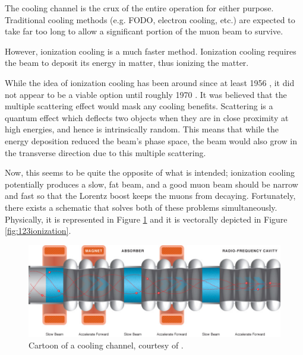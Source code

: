 The cooling channel is the crux of the entire operation for either purpose. Traditional cooling methods (e.g. FODO, electron cooling, etc.) are expected to take far too long to allow a significant portion of the muon beam to survive. 

However, ionization cooling is a much faster method. Ionization cooling requires the beam to deposit its energy in matter, thus ionizing the matter.

While the idea of ionization cooling has been around since at least 1956 \cite{oneill,lichtenberg}, it did not appear to be a viable option until roughly 1970 \cite{YuM}. It was believed that the multiple scattering effect would mask any cooling benefits. Scattering is a quantum effect which deflects two objects when they are in close proximity at high energies, and hence is intrinsically random. This means that while the energy deposition reduced the beam's phase space, the beam would also grow in the transverse direction due to this multiple scattering.

Now, this seems to be quite the opposite of what is intended; ionization cooling potentially produces a slow, fat beam, and a good muon beam should be narrow and fast so that the Lorentz boost keeps the muons from decaying. Fortunately, there exists a schematic that solves both of these problems simultaneously. Physically, it is represented in  Figure \ref{fig:coolingchannel} and it is vectorally depicted in Figure \ref{fig:123ionization}.
\begin{figure}
  \begin{center} 
    \includegraphics[width=\textwidth]{Figures/coolingchannel} 
  \caption{Cartoon of a cooling channel, courtesy of \cite{map}.}
  \label{fig:coolingchannel}
 \end{center}
\end{figure}

